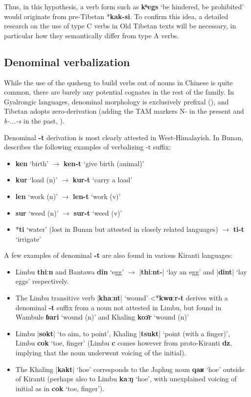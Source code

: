 \documentclass[oneside,a4paper,11pt]{article}
\newcommand{\ipa}[1]{{\phon\textbf{\mbox{#1}}}}
\newcommand{\dhatu}[2]{|\ipa{#1}| `#2'}
\begin{document}
Thus, in this hypothesis, a verb form such as \ipa{kʰegs} ‘be hindered, be prohibited’ would originate from pre-Tibetan *\ipa{kak-si}. To confirm this idea, a detailed research on the use of type C verbs in Old Tibetan texts will be necessary, in particular how they semantically differ from type A verbs.

 
\subsection{Denominal verbalization}
While the use of the qusheng to build verbs out of nouns in Chinese is quite common, there are barely any potential cognates in the rest of the family. In Gyalrongic languages, denominal morphology is exclusively prefixal (\citealt{jacques14antipassive}), and Tibetan adopts zero-derivation (adding the TAM markers N- in the present and \textit{b-...-s} in the past, \citealt[29]{jacques14esquisse}). 


Denominal \ipa{-t} derivation is most clearly attested in West-Himalayish. In Bunan, \citet[426]{widmer14bunan} describes the following examples of verbalizing -t suffix: 

\begin{itemize}
\item \ipa{ken} `birth' $\rightarrow$ \ipa{ken-t} `give birth (animal)'
\item \ipa{kur} `load (n)' $\rightarrow$ \ipa{kur-t} `carry a load'
\item \ipa{len} `work (n)' $\rightarrow$ \ipa{len-t} `work (v)'
\item \ipa{sur} `weed (n)' $\rightarrow$ \ipa{sur-t} `weed (v)'
\item *\ipa{ti} `water' (lost in Bunan but attested in closely related languages) $\rightarrow$ \ipa{ti-t} `irrigate'
\end{itemize}

A few examples of denominal \ipa{-t} are also found in various Kiranti languages:
\begin{itemize}
\item Limbu \ipa{thiːn} and Bantawa \ipa{din} `egg' $\rightarrow$ \dhatu{thiːnt-}{lay an egg} and \dhatu{dint}{lay eggs} respectively.  
\item The Limbu transitive verb \dhatu{khaːnt}{wound} <*\ipa{kwɑːr-t} derives with a denominal \ipa{-t} suffix from a noun not attested in Limbu, but found in Wambule \ipa{ɓari} `wound (n)' and Khaling \ipa{koɔ̄r} `wound (n)'
 \item Limbu \dhatu{sokt}{to aim, to point}, Khaling \dhatu{tsukt}{point (with a finger)}, Limbu \ipa{cok} `toe, finger' (Limbu \ipa{c} comes however from proto-Kiranti \ipa{dz}, implying that the noun underwent voicing of the initial).
 \item The Khaling \dhatu{kakt}{hoe} corresponds to the Japhug noun \ipa{qaʁ} `hoe' outside of Kiranti (perhaps also to Limbu \ipa{kaːŋ} `hoe', with unexplained voicing of initial as in \ipa{cok} `toe, finger').
\end{itemize}
\end{document}
